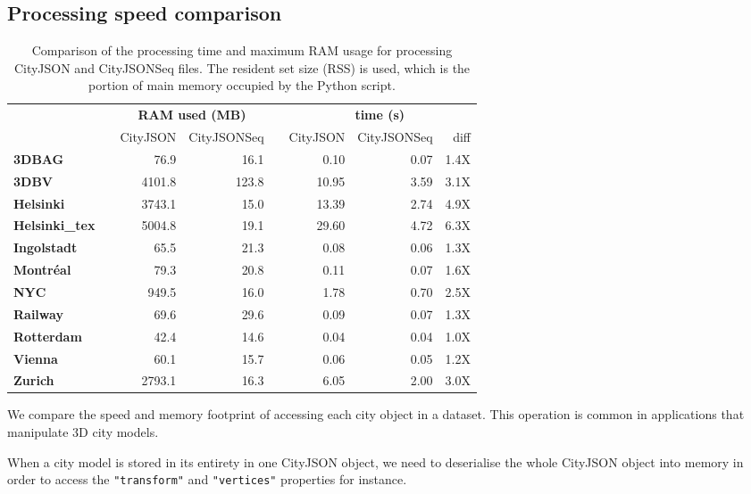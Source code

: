 \documentclass[11pt,halfparskip,parskip=half]{scrartcl}
\begin{document}
\subsection{Processing speed comparison}

\begin{table}
  \centering
  \caption{Comparison of the processing time and maximum RAM usage for processing CityJSON and CityJSONSeq files. The resident set size (RSS) is used, which is the portion of main memory occupied by the Python script.}
  \small
  \begin{tabular}
    {@{}lcrrcrrr@{}}\toprule
    &&  \multicolumn{2}{c}{\textbf{RAM used (MB)}} && \multicolumn{3}{c}{\textbf{time (s)}} \\
    \cmidrule{3-4} \cmidrule{6-8}
     && CityJSON & CityJSONSeq && CityJSON & CityJSONSeq & diff \\
    \midrule
     \textbf{3DBAG}         &&   76.9 &  16.1  &&   0.10 & 0.07 & 1.4X \\
     \textbf{3DBV}          && 4101.8 & 123.8  &&  10.95 & 3.59 & 3.1X \\
     \textbf{Helsinki}      && 3743.1 &  15.0  &&  13.39 & 2.74 & 4.9X \\
     \textbf{Helsinki\_tex} && 5004.8 &  19.1  &&  29.60 & 4.72 & 6.3X \\
     \textbf{Ingolstadt}    &&   65.5 &  21.3  &&   0.08 & 0.06 & 1.3X \\
     \textbf{Montréal}      &&   79.3 &  20.8  &&   0.11 & 0.07 & 1.6X \\
     \textbf{NYC}           &&  949.5 &  16.0  &&   1.78 & 0.70 & 2.5X \\
     \textbf{Railway}       &&   69.6 &  29.6  &&   0.09 & 0.07 & 1.3X \\
     \textbf{Rotterdam}     &&   42.4 &  14.6  &&   0.04 & 0.04 & 1.0X \\
     \textbf{Vienna}        &&   60.1 &  15.7  &&   0.06 & 0.05 & 1.2X \\
     \textbf{Zurich}        && 2793.1 &  16.3  &&   6.05 & 2.00 & 3.0X \\
    \bottomrule
  \end{tabular}%
  \label{tab:ramtime}
\end{table}

We compare the speed and memory footprint of accessing each city object in a dataset.
This operation is common in applications that manipulate 3D city models.

When a city model is stored in its entirety in one CityJSON object, we need to deserialise the whole CityJSON object into memory in order to access the \texttt{"transform"} and \texttt{"vertices"} properties for instance.
\end{document}

